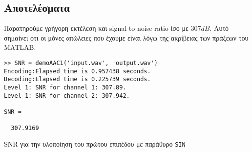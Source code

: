 \subsection{Αποτελέσματα}\label{sub:results1}
Παρατηρούμε γρήγορη εκτέλεση και signal to noise ratio ίσο με $307 dB$.
Αυτό σημαίνει ότι οι μόνες απώλειες που έχουμε είναι λόγω της ακρίβειας των πράξεων του MATLAB.
\begin{code}
\begin{verbatim}
>> SNR = demoAAC1('input.wav', 'output.wav')
Encoding:Elapsed time is 0.957438 seconds.
Decoding:Elapsed time is 0.225739 seconds.
Level 1: SNR for channel 1: 307.89.
Level 1: SNR for channel 2: 307.942.

SNR =

  307.9169
\end{verbatim}
\caption{SNR για την υλοποίηση του πρώτου επιπέδου με παράθυρο \texttt{SIN}}
\end{code}
